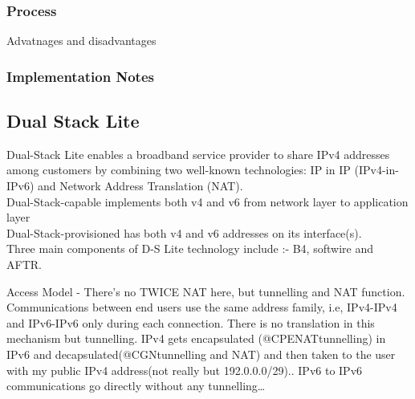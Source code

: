 \documentclass[iwp,first]{luthesis}
\begin{document}
\subsubsection {Process}
Advatnages and disadvantages
\subsubsection {Implementation Notes}





















\subsection{Dual Stack Lite}

Dual-Stack Lite enables a broadband service provider to share IPv4 addresses among customers by combining two well-known technologies: IP in IP (IPv4-in-IPv6) and Network Address Translation (NAT).
\\Dual-Stack-capable implements both v4 and v6 from network layer to application layer
\\Dual-Stack-provisioned has both v4 and v6 addresses on its interface(s).
\\Three main components of D-S Lite technology include :- B4, softwire and AFTR.

Access Model - There’s no TWICE NAT here, but tunnelling and NAT function. Communications between end users use the same address family, i.e, IPv4-IPv4 and IPv6-IPv6 only during each connection. There is no translation in this mechanism but tunnelling. IPv4 gets encapsulated (@CPENAT{tunnelling}) in IPv6 and decapsulated(@CGN{tunnelling and NAT}) and then taken to the user with my public IPv4 address(not really but 192.0.0.0/29).. IPv6 to IPv6 communications go directly without any tunnelling…
\end{document}
